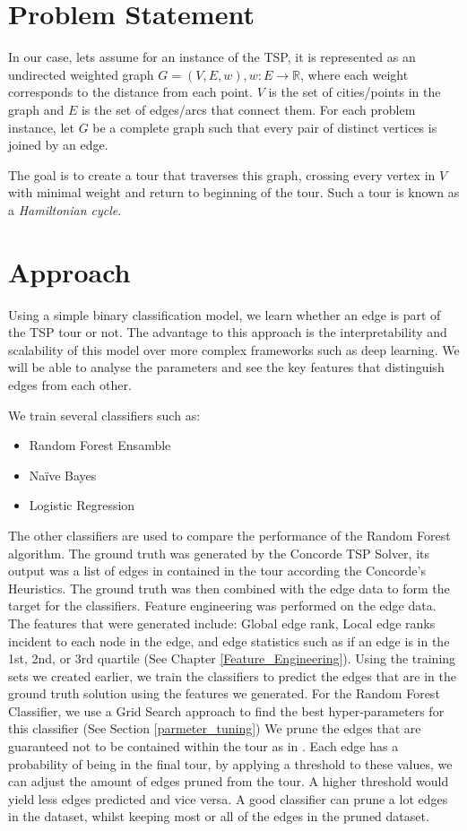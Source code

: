 \documentclass[]{UCD_CS_FYP_Report}
\begin{document}
\section{Problem Statement}
In our case, lets assume for an instance of the TSP, it is represented as an undirected weighted graph $G = (V, E, w), w:E\to\mathbb{R}$, where each weight corresponds to the distance from each point. $V$ is the set of cities/points in the graph and $E$ is the set of edges/arcs that connect them. For each problem instance, let $G$ be a complete graph such that every pair of distinct vertices is joined by an edge.

The goal is to create a tour that traverses this graph, crossing every vertex in $V$ with minimal weight and return to beginning of the tour. Such a tour is known as a \textit{Hamiltonian cycle}.

\section{Approach}
Using a simple binary classification model, we learn whether an edge is part of the TSP tour or not. The advantage to this approach is the interpretability and scalability of this model over more complex frameworks such as deep learning. We will be able to analyse the parameters and see the key features that distinguish edges from each other.

We train several classifiers such as:
\begin{itemize}
    \item Random Forest Ensamble
    \item Naïve Bayes
    \item Logistic Regression
\end{itemize}

The other classifiers are used to compare the performance of the Random Forest algorithm.
The ground truth was generated by the Concorde TSP Solver, its output was a list of edges in contained in the tour according the Concorde’s Heuristics. The ground truth was then combined with the edge data to form the target for the classifiers.
Feature engineering was performed on the edge data. The features that were generated include: Global edge rank, Local edge ranks incident to each node in the edge, and edge statistics such as if an edge is in the 1st, 2nd, or 3rd quartile (See Chapter \ref{Feature_Engineering}).
Using the training sets we created earlier, we train the classifiers to predict the edges that are in the ground truth solution using the features we generated. For the Random Forest Classifier, we use a Grid Search approach to find the best hyper-parameters for this classifier (See Section \ref{parmeter_tuning})
We prune the edges that are guaranteed not to be contained within the tour as in \cite{iAAA}. Each edge has a probability of being in the final tour, by applying a threshold to these values, we can adjust the amount of edges pruned from the tour. A higher threshold would yield less edges predicted and vice versa.
A good classifier can prune a lot edges in the dataset, whilst keeping most or all of the edges in the pruned dataset.
\end{document}
